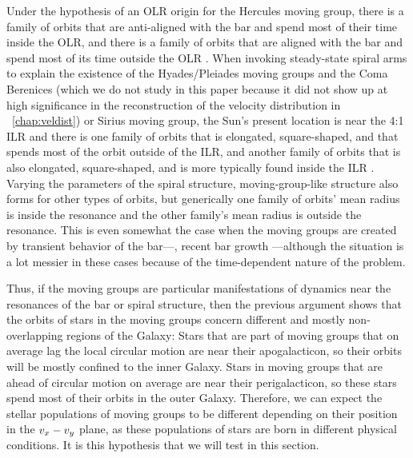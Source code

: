 Under the hypothesis of an OLR origin for the Hercules moving group,
there is a family of orbits that are anti-aligned with the bar and
spend most of their time inside the OLR, and there is a family of
orbits that are aligned with the bar and spend most of its time
outside the OLR \citep{Contopoulos89a}. When invoking steady-state
spiral arms to explain the existence of the Hyades/Pleiades moving
groups and the Coma Berenices (which we do not study in this paper
because it did not show up at high significance in the reconstruction
of the velocity distribution in \chaptername~\ref{chap:veldist}) or
Sirius moving group, the Sun's present location is near the 4:1 ILR
and there is one family of orbits that is elongated, square-shaped,
and that spends most of the orbit outside of the ILR, and another
family of orbits that is also elongated, square-shaped, and is more
typically found inside the ILR
\citep{Contopoulos86a}. Varying the parameters of the spiral
structure, moving-group-like structure also forms for other types of
orbits, but generically one family of orbits' mean radius is inside
the resonance and the other family's mean radius is outside the
resonance. This is even somewhat the case when the moving groups are
created by transient behavior of the bar---\eg, recent bar growth
\citep{Minchev09a}---although the situation is a lot messier in these
cases because of the time-dependent nature of the problem.


Thus, if the moving groups are particular manifestations of dynamics
near the resonances of the bar or spiral structure, then the previous
argument shows that the orbits of stars in the moving groups concern
different and mostly non-overlapping regions of the Galaxy: Stars that
are part of moving groups that on average lag the local circular
motion are near their apogalacticon, so their orbits will be mostly
confined to the inner Galaxy. Stars in moving groups that are ahead of
circular motion on average are near their perigalacticon, so these
stars spend most of their orbits in the outer Galaxy. Therefore, we
can expect the stellar populations of moving groups to be different
depending on their position in the $v_x-v_y$ plane, as these
populations of stars are born in different physical conditions. It is
this hypothesis that we will test in this section.


